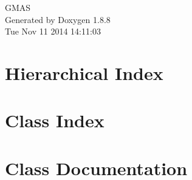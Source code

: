 \documentclass[twoside]{book}
\newcommand{\+}{\discretionary{\mbox{\scriptsize$\hookleftarrow$}}{}{}}
\newcommand{\clearemptydoublepage}{%
  \newpage{\pagestyle{empty}\cleardoublepage}%
}
\begin{document}
\hypersetup{pageanchor=false,
             bookmarks=true,
             bookmarksnumbered=true,
             pdfencoding=unicode
            }
\begin{titlepage}
\vspace*{7cm}
\begin{center}%
{\Large G\+M\+A\+S }\\
\vspace*{1cm}
{\large Generated by Doxygen 1.8.8}\\
\vspace*{0.5cm}
{\small Tue Nov 11 2014 14:11:03}\\
\end{center}
\end{titlepage}
\clearemptydoublepage
\tableofcontents
\clearemptydoublepage
{}
\hypersetup{pageanchor=true}

\chapter{Hierarchical Index}

\chapter{Class Index}

\chapter{Class Documentation}



























\newpage
{}
{}
\printindex
\end{document}
